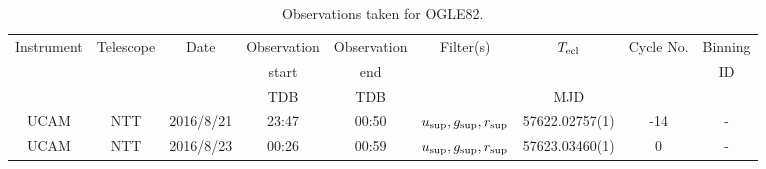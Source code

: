\begin{table}
	\begin{center}
		\caption{Observations taken for OGLE82.}
		\label{table:observing:observation logs OGLE82}
		\begin{tabular}{ccccccccc}
			\hline
			Instrument & Telescope & Date & Observation  & Observation  & Filter(s) & $T_{\rm ecl}$ & Cycle No. & Binning \\
			 &  &  &  start &  end &  &  &  & ID \\
			 &  &  & TDB & TDB &  & MJD &  &  \\
			\hline
			\hline
			UCAM & NTT & 2016/8/21 & 23:47 & 00:50 & $u_{\rm sup},g_{\rm sup},r_{\rm sup}$ & 57622.02757(1) & -14 & - \\
			UCAM & NTT & 2016/8/23 & 00:26 & 00:59 & $u_{\rm sup},g_{\rm sup},r_{\rm sup}$ & 57623.03460(1) &   0 & - \\
		   \hline
		\end{tabular}
	\end{center}
\end{table}